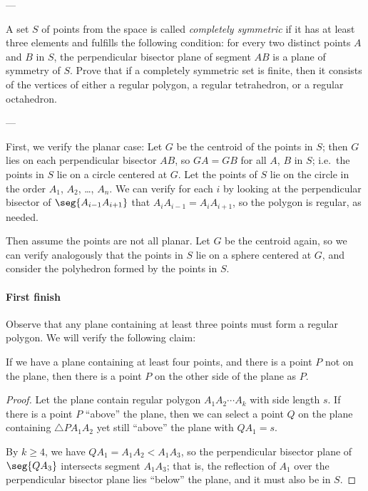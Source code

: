 
---

A set $S$ of points from the space is called \emph{completely symmetric} if it has at least three elements and fulfills the following condition: for every two distinct points $A$ and $B$ in $S$, the perpendicular bisector plane of segment $AB$ is a plane of symmetry of $S$. Prove that if a completely symmetric set is finite, then it consists of the vertices of either a regular polygon, a regular tetrahedron, or a regular octahedron.

---

First, we verify the planar case:
Let $G$ be the centroid of the points in $S$; then $G$ lies on each perpendicular bisector $AB$, so $GA=GB$ for all $A$, $B$ in $S$; i.e.\ the points in $S$ lie on a circle centered at $G$. Let the points of $S$ lie on the circle in the order $A_1$, $A_2$, \ldots, $A_n$. We can verify for each $i$ by looking at the perpendicular bisector of $\seg{A_{i-1}A_{i+1}}$ that $A_iA_{i-1}=A_iA_{i+1}$, so the polygon is regular, as needed.

Then assume the points are not all planar. Let $G$ be the centroid again, so we can verify analogously that the points in $S$ lie on a sphere centered at $G$, and consider the polyhedron formed by the points in $S$.

\paragraph{First finish}
Observe that any plane containing at least three points must form a regular polygon. We will verify the following claim:
\begin{claim*}
    If we have a plane containing at least four points, and there is a point $P$ not on the plane, then there is a point $P$ on the other side of the plane as $P$.
\end{claim*}
\begin{proof}
    Let the plane contain regular polygon $A_1A_2\cdots A_k$ with side length $s$. If there is a point $P$ ``above'' the plane, then we can select a point $Q$ on the plane containing $\triangle PA_1A_2$ yet still ``above'' the plane with $QA_1=s$.

    By $k\ge4$, we have $QA_1=A_1A_2<A_1A_3$, so the perpendicular bisector plane of $\seg{QA_3}$ intersects segment $A_1A_3$; that is, the reflection of $A_1$ over the perpendicular bisector plane lies ``below'' the plane, and it must also be in $S$.
\end{proof}

